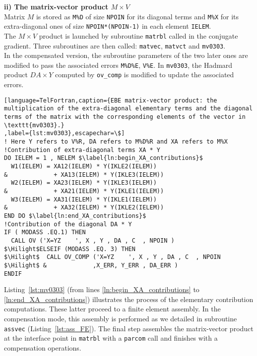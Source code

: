 %
\textbf{ii) The matrix-vector product $M \times V$}\\
Matrix $M$ is stored as \texttt{M\%D} of size \texttt{NPOIN}
for its diagonal terms and \texttt{M\%X} for its extra-diagonal ones
of size \texttt{NPOIN*(NPOIN-1)}
in each element \texttt{IELEM}.\\
%
The $M \times V$ product is launched by subroutine \texttt{matrbl}
called in the conjugate gradient.
Three subroutines are then called: \texttt{matvec}, \texttt{matvct}
and  \texttt{mv0303}.\\
In the compensated version, the subroutine parameters of
the two later ones are modified
to pass the associated errors \texttt{M\%D\%E}, \texttt{V\%E}.
In \texttt{mv0303}, the Hadmard product $DA \times Y$ computed
by \texttt{ov\_comp} is modified to update the associated errors.
%
\begin{lstlisting}[language=TelFortran,caption={EBE matrix-vector product: the multiplication of the extra-diagonal elementary terms and the diagonal terms of the matrix with the corresponding elements of the vector in \texttt{mv0303}.}
,label={lst:mv0303},escapechar=\$]
! Here Y refers to V%R, DA refers to M%D%R and XA refers to M%X
!Contribution of extra-diagonal terms XA * Y
DO IELEM = 1 , NELEM $\label{ln:begin_XA_contributions}$
  W1(IELEM) = XA12(IELEM) * Y(IKLE2(IELEM))
&             + XA13(IELEM) * Y(IKLE3(IELEM))
  W2(IELEM) = XA23(IELEM) * Y(IKLE3(IELEM))
&             + XA21(IELEM) * Y(IKLE1(IELEM))
  W3(IELEM) = XA31(IELEM) * Y(IKLE1(IELEM))
&             + XA32(IELEM) * Y(IKLE2(IELEM))
END DO $\label{ln:end_XA_contributions}$
!Contribution of the diagonal DA * Y
IF ( MODASS .EQ.1) THEN
  CALL OV ('X=YZ    ', X , Y , DA , C  , NPOIN )
$\Hilight$ELSEIF (MODASS .EQ. 3) THEN
$\Hilight$  CALL OV_COMP ('X=YZ    ', X , Y , DA , C  , NPOIN
$\Hilight$ &             ,X_ERR, Y_ERR , DA_ERR	)
ENDIF
\end{lstlisting}
%
Listing~\ref{lst:mv0303} (from lines \ref{ln:begin_XA_contributions} to
\ref{ln:end_XA_contributions}) illustrates the process of the
elementary contribution computations.
These latter proceed to a finite element assembly.
In the compensation mode, this assembly is performed as we detailed
in subroutine \texttt{assvec} (Listing~\ref{lst:ass_FE}).
%
The final step assembles the matrix-vector product
at the interface point in \texttt{matrbl} with a \texttt{parcom} call
and finishes with a compensation operations.
%
